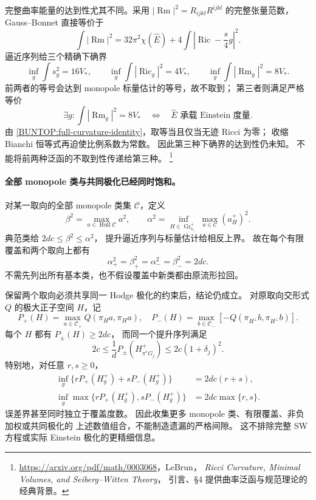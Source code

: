 \documentclass[UTF8,fontset=fandol,zihao=-4,oneside,openany]{ctexbook}
\theoremstyle{cjkplain}
\numberwithin{equation}{chapter}
\begin{document}
完整曲率能量的达到性尤其不同。采用
\(|\operatorname{Rm}|^2=R_{ijkl}R^{ijkl}\) 的完整张量范数，
Gauss--Bonnet 直接等价于
\begin{equation}
 \int|\operatorname{Rm}|^2
 =32\pi^2\chi(\widehat E)
  +4\int\left|\operatorname{Ric}-\frac s4g\right|^2 .
 \label{BUNTOP:full-curvature-identity}
\end{equation}
逼近序列给三个精确下确界
\begin{equation}
 \inf_g\int s_g^2=16V_*,
 \qquad\inf_g\int|\operatorname{Ric}_g|^2=4V_*,
 \qquad\inf_g\int|\operatorname{Rm}_g|^2=8V_* .
 \label{BUNTOP:three-energies}
\end{equation}
前两者的等号会达到 monopole 标量估计的等号，故不取到；
第三者则满足严格等价
\begin{equation}
 \exists g:\int|\operatorname{Rm}_g|^2=8V_*
 \quad\Longleftrightarrow\quad
 \widehat E\text{ 承载 Einstein 度量}.
 \label{BUNTOP:full-energy-attainment}
\end{equation}
由 \eqref{BUNTOP:full-curvature-identity}，取等当且仅当无迹 Ricci 为零；
收缩 Bianchi 恒等式再迫使比例系数为常数。
因此第三种下确界的达到性仍未知。
不能将前两种泛函的不取到性传递给第三种。%
\footnote{\url{https://arxiv.org/pdf/math/0003068}，LeBrun，
\emph{Ricci Curvature, Minimal Volumes, and Seiberg--Witten Theory}，
引言、§4 提供曲率泛函与规范理论的经典背景。}

\paragraph{全部 monopole 类与共同极化已经同时饱和。}
对某一取向的全部 monopole 类集 \(\mathcal C\)，定义
\[
 \beta^2=\max_{a\in\operatorname{Hull}\mathcal C}a^2,\qquad
 \alpha^2=\inf_{H\in\operatorname{Gr}_{b_+}^+}
              \max_{a\in\mathcal C}(a_H^+)^2 .
\]
典范类给 \(2dc\le\beta^2\le\alpha^2\)，
提升逼近序列与标量估计给相反上界。
故在每个有限覆盖和两个取向上都有
\begin{equation}
 \alpha_+^2=\beta_+^2=\alpha_-^2=\beta_-^2=2dc .
 \label{BUNTOP:all-monopoles}
\end{equation}
不需先列出所有基本类，也不假设覆盖中新类都由原流形拉回。

保留两个取向必须共享同一 Hodge 极化的约束后，结论仍成立。
对原取向交形式 \(Q\) 的极大正子空间 \(H\)，记
\[
 P_+(H)=\max_{a\in\mathcal C_+}Q(\pi_Ha,\pi_Ha),\quad
 P_-(H)=\max_{b\in\mathcal C_-}
              [-Q(\pi_{H^\perp}b,\pi_{H^\perp}b)].
\]
每个 \(H\) 都有 \(P_\pm(H)\ge2dc\)，
而同一个提升序列满足
\begin{equation}
 2c\le\frac1d P_\pm(H_{\pi^*G_j}^+)
 \le2c(1+\delta_j)^2 .
 \label{BUNTOP:joint-uniform}
\end{equation}
特别地，对任意 \(r,s\ge0\)，
\begin{align}
 \inf_g\{rP_+(H_g^+)+sP_-(H_g^+)\}&=2dc(r+s),\nonumber\\
 \inf_g\max\{rP_+(H_g^+),sP_-(H_g^+)\}
 &=2dc\max\{r,s\} .
 \label{BUNTOP:joint-minimax}
\end{align}
误差界甚至同时独立于覆盖度数。
因此收集更多 monopole 类、有限覆盖、非负加权或共同极化的
上述数值组合，不能制造遗漏的严格间隙。
这不排除完整 SW 方程或实际 Einstein 极化的更精细信息。
\end{document}
